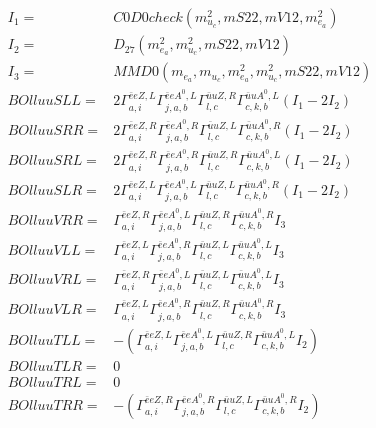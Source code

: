 \documentclass[A4,landscape]{article}
\begin{document}
\begin{align} 
I_1 = & C0D0check(m^2_{u_{{c}}}, mS22, mV12, m^2_{e_{{a}}}) \\ 
I_2 = & D_{27}(m^2_{e_{{a}}}, m^2_{u_{{c}}}, mS22, mV12) \\ 
I_3 = & MMD0(m_{e_{{a}}}, m_{u_{{c}}}, m^2_{e_{{a}}}, m^2_{u_{{c}}}, mS22, mV12) \\ 
  BOlluuSLL= & 2  \Gamma^{\bar{e}e Z ,L}_{a, i} \Gamma^{\bar{e}e A^0 ,L}_{j, a, b} \Gamma^{\bar{u}u Z ,R}_{l, c} \Gamma^{\bar{u}u A^0 ,L}_{c, k, b} (I_1 - 2 I_2) \\ 
  BOlluuSRR= & 2  \Gamma^{\bar{e}e Z ,R}_{a, i} \Gamma^{\bar{e}e A^0 ,R}_{j, a, b} \Gamma^{\bar{u}u Z ,L}_{l, c} \Gamma^{\bar{u}u A^0 ,R}_{c, k, b} (I_1 - 2 I_2) \\ 
  BOlluuSRL= & 2  \Gamma^{\bar{e}e Z ,R}_{a, i} \Gamma^{\bar{e}e A^0 ,R}_{j, a, b} \Gamma^{\bar{u}u Z ,R}_{l, c} \Gamma^{\bar{u}u A^0 ,L}_{c, k, b} (I_1 - 2 I_2) \\ 
  BOlluuSLR= & 2  \Gamma^{\bar{e}e Z ,L}_{a, i} \Gamma^{\bar{e}e A^0 ,L}_{j, a, b} \Gamma^{\bar{u}u Z ,L}_{l, c} \Gamma^{\bar{u}u A^0 ,R}_{c, k, b} (I_1 - 2 I_2) \\ 
  BOlluuVRR= &  \Gamma^{\bar{e}e Z ,R}_{a, i} \Gamma^{\bar{e}e A^0 ,L}_{j, a, b} \Gamma^{\bar{u}u Z ,R}_{l, c} \Gamma^{\bar{u}u A^0 ,R}_{c, k, b} I_3 \\ 
  BOlluuVLL= &  \Gamma^{\bar{e}e Z ,L}_{a, i} \Gamma^{\bar{e}e A^0 ,R}_{j, a, b} \Gamma^{\bar{u}u Z ,L}_{l, c} \Gamma^{\bar{u}u A^0 ,L}_{c, k, b} I_3 \\ 
  BOlluuVRL= &  \Gamma^{\bar{e}e Z ,R}_{a, i} \Gamma^{\bar{e}e A^0 ,L}_{j, a, b} \Gamma^{\bar{u}u Z ,L}_{l, c} \Gamma^{\bar{u}u A^0 ,L}_{c, k, b} I_3 \\ 
  BOlluuVLR= &  \Gamma^{\bar{e}e Z ,L}_{a, i} \Gamma^{\bar{e}e A^0 ,R}_{j, a, b} \Gamma^{\bar{u}u Z ,R}_{l, c} \Gamma^{\bar{u}u A^0 ,R}_{c, k, b} I_3 \\ 
  BOlluuTLL= & -( \Gamma^{\bar{e}e Z ,L}_{a, i} \Gamma^{\bar{e}e A^0 ,L}_{j, a, b} \Gamma^{\bar{u}u Z ,R}_{l, c} \Gamma^{\bar{u}u A^0 ,L}_{c, k, b} I_2) \\ 
  BOlluuTLR= & 0 \\ 
  BOlluuTRL= & 0 \\ 
  BOlluuTRR= & -( \Gamma^{\bar{e}e Z ,R}_{a, i} \Gamma^{\bar{e}e A^0 ,R}_{j, a, b} \Gamma^{\bar{u}u Z ,L}_{l, c} \Gamma^{\bar{u}u A^0 ,R}_{c, k, b} I_2) \\ 
\end{align} 
\end{document}
